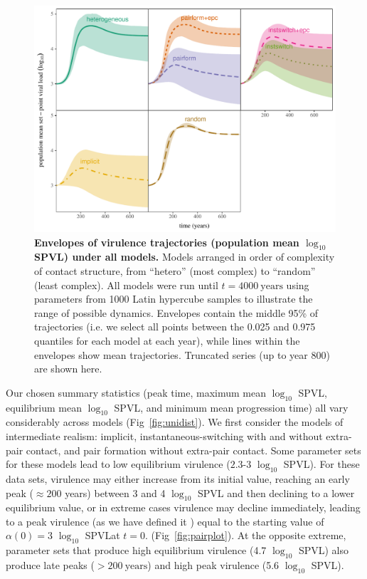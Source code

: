 \documentclass[10pt,letterpaper]{article}
\renewcommand{\figurename}{Fig}
\newcommand{\Lspvl}{$\log_{10}$ SPVL}
\begin{document}
\begin{figure}[!ht]
\includegraphics[width=\textwidth]{../figures/fig2.pdf}
\caption{{\bf Envelopes of virulence trajectories (population mean \Lspvl) under all models.}
Models arranged in order of complexity of contact structure, from 
``hetero'' (most complex) to ``random'' (least complex).
All models were run until $t=4000~\textrm{years}$ using parameters from 1000 Latin hypercube samples to illustrate the range of possible dynamics. Envelopes contain the middle 95\% of trajectories (i.e. we select all points between the 0.025 and 0.975 quantiles for each model at each year), while lines within the envelopes show mean trajectories. Truncated series (up to year 800) are shown here.}
\label{fig:virtraj}
\end{figure}

Our chosen summary statistics (peak time, maximum mean \Lspvl, equilibrium mean \Lspvl, and minimum mean progression time) 
all vary considerably across models
(\figurename~\ref{fig:unidist}).
We first consider the models of intermediate realism: implicit,
instantaneous-switching with and without extra-pair contact, and
pair formation without extra-pair contact. 
Some parameter
sets for these models lead to low equilibrium virulence ($2.3$-$3$ \Lspvl).
For these data sets, virulence may either increase from its initial value,
reaching an early peak ($\approx 200$ years) between 3 and 4 \Lspvl
and then declining to a lower equilibrium value, or in extreme cases
virulence may decline immediately, leading to a peak virulence (as we have
defined it ) equal to the starting value of $\alpha(0)=3$ \Lspvl at $t=0$.
(\figurename~\ref{fig:pairplot}).
At the opposite extreme, parameter sets that produce high equilibrium virulence (4.7 \Lspvl)
also produce late peaks ($> 200~\text{years}$) and
high peak virulence (5.6 \Lspvl).
\end{document}
